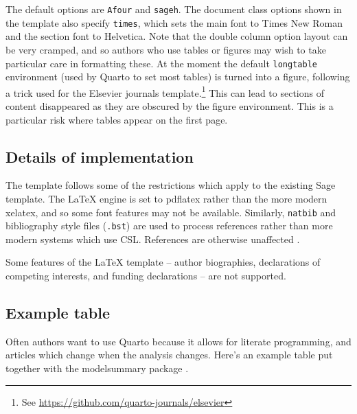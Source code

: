 \documentclass[
  Review,
  times,
  sageh]{sagej}
\begin{document}
The default options are \texttt{Afour} and \texttt{sageh}. The document
class options shown in the template also specify \texttt{times}, which
sets the main font to Times New Roman and the section font to Helvetica.
Note that the double column option layout can be very cramped, and so
authors who use tables or figures may wish to take particular care in
formatting these. At the moment the default \texttt{longtable}
environment (used by Quarto to set most tables) is turned into a figure,
following a trick used for the Elsevier journals template.\footnote{See
  \url{https://github.com/quarto-journals/elsevier}} This can lead to
sections of content disappeared as they are obscured by the figure
environment. This is a particular risk where tables appear on the first
page.

\hypertarget{details-of-implementation}{%
\subsection{Details of implementation}\label{details-of-implementation}}

The template follows some of the restrictions which apply to the
existing Sage template. The \LaTeX{} engine is set to pdflatex rather
than the more modern xelatex, and so some font features may not be
available. Similarly, \texttt{natbib} and bibliography style files
(\texttt{.bst}) are used to process references rather than more modern
systems which use CSL. References are otherwise unaffected
\citep{CameronTrivedi2013, hanretty2022party}.

Some features of the \LaTeX{} template -- author biographies,
declarations of competing interests, and funding declarations -- are not
supported.

\hypertarget{example-table}{%
\subsection{Example table}\label{example-table}}

Often authors want to use Quarto because it allows for literate
programming, and articles which change when the analysis changes. Here's
an example table put together with the modelsummary package
\citep{msummary}.
\end{document}
